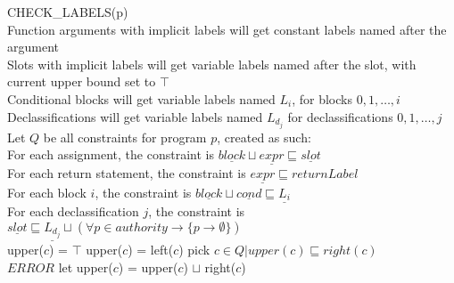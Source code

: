 \begin{algorithm}[h]
\SetAlgoNoEnd
CHECK\_LABELS(p)\\
Function arguments with implicit labels will get constant labels named after the argument\\
Slots with implicit labels will get variable labels named after the slot, with current upper bound set to $\top$\\
Conditional blocks will get variable labels named $L_i$, for blocks $0, 1, \dots, i$\\
Declassifications will get variable labels named $L_{d_j}$ for declassifications $0, 1, \dots, j$\\
Let $Q$ be all constraints for program $p$, created as such:\\
For each assignment, the constraint is $\underline{block} \sqcup \underline{expr} \sqsubseteq \underline{slot}$\\
For each return statement, the constraint is $\underline{expr} \sqsubseteq returnLabel$\\
For each block $i$, the constraint is $\underline{block} \sqcup \underline{cond} \sqsubseteq \underline{L_i}$\\
For each declassification $j$, the constraint is $\underline{slot} \sqsubseteq \underline{L_{d_j}} \sqcup (\forall p \in authority \longrightarrow \{ p \rightarrow \emptyset\})$\\
{
  {
    upper($c$) = $\top$
  }
  \Else
  {
    upper($c$) = left($c$)
  }
}
{
  pick $c \in Q | upper(c) \sqsubseteq right(c)$\\
  {
    $ERROR$
  }
  let upper($c$) = upper($c$) $\sqcup$ right($c$)
}
\end{algorithm}
